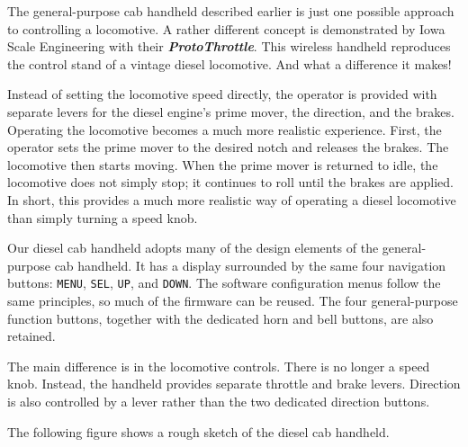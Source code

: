 The general-purpose cab handheld described earlier is just one possible approach to controlling a locomotive. A rather different concept is demonstrated by Iowa Scale Engineering with their \textbf{\textit{ProtoThrottle}}. This wireless handheld reproduces the control stand of a vintage diesel locomotive. And what a difference it makes!

Instead of setting the locomotive speed directly, the operator is provided with separate levers for the diesel engine’s prime mover, the direction, and the brakes.
Operating the locomotive becomes a much more realistic experience. First, the operator sets the prime mover to the desired notch and releases the brakes. The locomotive then starts moving. When the prime mover is returned to idle, the locomotive does not simply stop; it continues to roll until the brakes are applied.
In short, this provides a much more realistic way of operating a diesel locomotive than simply turning a speed knob.

Our diesel cab handheld adopts many of the design elements of the general-purpose cab handheld. It has a display surrounded by the same four navigation buttons: \texttt{MENU}, \texttt{SEL}, \texttt{UP}, and \texttt{DOWN}. The software configuration menus follow the same principles, so much of the firmware can be reused.
The four general-purpose function buttons, together with the dedicated horn and bell buttons, are also retained.

The main difference is in the locomotive controls. There is no longer a speed knob. Instead, the handheld provides separate throttle and brake levers. Direction is also controlled by a lever rather than the two dedicated direction buttons.

The following figure shows a rough sketch of the diesel cab handheld.


